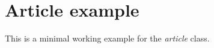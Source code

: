 \section{Article example}\label{sec:article_example}
This is a minimal working example for the \textit{article} class.
